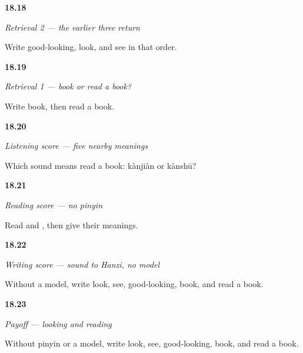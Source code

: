 \noindent\begin{minipage}[t]{\linewidth}
\raggedright
\hypertarget{review-ZH-R18-looking-three-r2-order}{\textbf{18.18}} \emph{Retrieval 2 — the earlier three return}\par
\small Write good-looking, look, and see in that order.
\end{minipage}\par\medskip

\noindent\begin{minipage}[t]{\linewidth}
\raggedright
\hypertarget{review-ZH-R18-book-reading-r1-order}{\textbf{18.19}} \emph{Retrieval 1 — book or read a book?}\par
\small Write book, then read a book.
\end{minipage}\par\medskip

\noindent\begin{minipage}[t]{\linewidth}
\raggedright
\hypertarget{review-ZH-R18-listening-five-contrast}{\textbf{18.20}} \emph{Listening score — five nearby meanings}\par
\small Which sound means read a book: kànjiàn or kànshū?
\end{minipage}\par\medskip

\noindent\begin{minipage}[t]{\linewidth}
\raggedright
\hypertarget{review-ZH-R18-reading-five-endings}{\textbf{18.21}} \emph{Reading score — no pinyin}\par
\small Read  and , then give their meanings.
\end{minipage}\par\medskip

\noindent\begin{minipage}[t]{\linewidth}
\raggedright
\hypertarget{review-ZH-R18-writing-five-order}{\textbf{18.22}} \emph{Writing score — sound to Hanzi, no model}\par
\small Without a model, write look, see, good-looking, book, and read a book.
\end{minipage}\par\medskip

\noindent\begin{minipage}[t]{\linewidth}
\raggedright
\hypertarget{review-ZH-C18-practice-pass}{\textbf{18.23}} \emph{Payoff — looking and reading}\par
\small Without pinyin or a model, write look, see, good-looking, book, and read a book.
\end{minipage}\par\medskip

